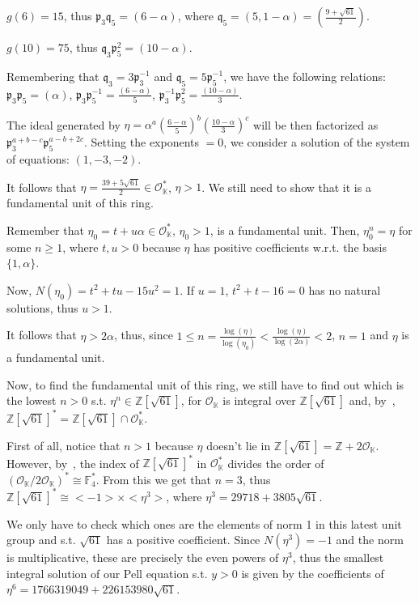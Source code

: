\documentclass{article}
\newcommand{\numberset}{\mathbb}
\newcommand{\Z}{\numberset{Z}}
\newcommand{\K}{\numberset{K}}
\newcommand{\F}{\numberset{F}}
\newcommand{\pid}{\mathfrak{p}}
\newcommand{\qid}{\mathfrak{q}}
\begin{document}
$g(6)=15$, thus $\pid_3\qid_5=(6-\alpha)$, where $\qid_5=(5,1-\alpha)=(\frac{9+\sqrt{61}}{2})$.

$g(10)=75$, thus $\qid_3\pid_5^2=(10-\alpha)$.

Remembering that $\qid_3=3\pid_3^{-1}$ and $\qid_5=5\pid_5^{-1}$, we have the following relations: $\pid_3\pid_5=(\alpha)$, $\pid_3\pid_5^{-1}=\frac{(6-\alpha)}{5}$, $\pid_3^{-1}\pid_5^2=\frac{(10-\alpha)}{3}$.

The ideal generated by $\eta=\alpha^a(\frac{6-\alpha}{5})^b(\frac{10-\alpha}{3})^c$ will be then factorized as $\pid_3^{a+b-c}\pid_5^{a-b+2c}$. Setting the exponents $=0$, we consider a solution of the system of equations: $(1,-3,-2)$.

It follows that $\eta=\frac{39+5\sqrt{61}}{2}\in\mathcal{O}_{\K}^*$, $\eta>1$. We still need to show that it is a fundamental unit of this ring.

Remember that $\eta_0=t+u\alpha\in\mathcal{O}_{\K}^*$, $\eta_0>1$, is a fundamental unit. Then, $\eta_0^n=\eta$ for some $n\geq 1$, where $t,u>0$ because $\eta$ has positive coefficients w.r.t. the basis $\{1,\alpha\}$.

Now, $N(\eta_0)=t^2+tu-15u^2=1$. If $u=1$, $t^2+t-16=0$ has no natural solutions, thus $u>1$.

It follows that $\eta>2\alpha$, thus, since $1\leq n=\frac{\log(\eta)}{\log(\eta_0)}<\frac{\log(\eta)}{\log(2\alpha)}<2$, $n=1$ and $\eta$ is a fundamental unit.

Now, to find the fundamental unit of this ring, we still have to find out which is the lowest $n>0$ s.t. $\eta^n\in\Z[\sqrt{61}]$, for $\mathcal{O}_{\K}$ is integral over $\Z[\sqrt{61}]$ and, by~\cite[ex. 5.20]{stev}, $\Z[\sqrt{61}]^*=\Z[\sqrt{61}]\cap\mathcal{O}_{\K}^*$.

First of all, notice that $n>1$ because $\eta$ doesn't lie in $\Z[\sqrt{61}]=\Z+2\mathcal{O}_{\K}$. However, by~\cite[5.16]{stev}, the index of $\Z[\sqrt{61}]^*$ in $\mathcal{O}_{\K}^*$ divides the order of $(\mathcal{O}_{\K}/2\mathcal{O}_{\K})^*\cong\F_4^*$. From this we get that $n=3$, thus $\Z[\sqrt{61}]^*\cong<-1>\times<\eta^3>$, where $\eta^3=29718+3805\sqrt{61}$.

We only have to check which ones are the elements of norm 1 in this latest unit group and s.t. $\sqrt{61}$ has a positive coefficient. Since $N(\eta^3)=-1$ and the norm is multiplicative, these are precisely the even powers of $\eta^3$, thus the smallest integral solution of our Pell equation s.t. $y>0$ is given by the coefficients of $\eta^6=1766319049+226153980\sqrt{61}$.
\end{document}

